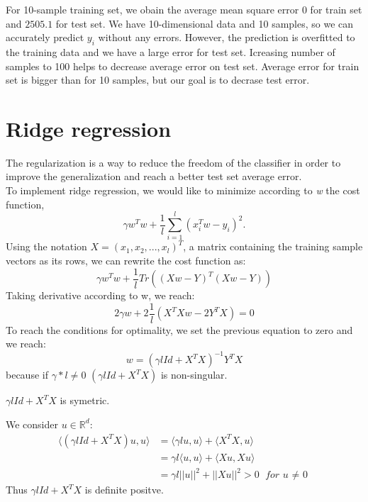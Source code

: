 \documentclass{article} %
\begin{document}
For 10-sample training set, we obain the average mean square error $0$ for train set and $2505.1$ for test set. We have 10-dimensional data and 10 samples, so we can accurately predict $y_i$ without any errors. However, the prediction is overfitted to the training data and we have a large error for test set. Icreasing number of samples to 100 helps to decrease average error on test set. Average error for train set is bigger than for 10 samples, but our goal is to decrase test error.

\section{Ridge regression}

The regularization is a way to reduce the freedom of the classifier in order to improve the generalization and reach a better test set average error. 
\\ To implement ridge regression, we would like to minimize according to \textit{w} the cost function, 
\begin{equation}
\gamma w^{T}w + \frac{1}{l} \sum_{i=1}^{l}(x_{i}^{T}w - y_{i})^{2}.
\end{equation}
Using the notation $X=(x_{1}, x_{2},...,x_{l})^{T}$, a matrix containing the training sample vectors as its rows, we can rewrite the cost function as: 
\begin{equation}
\gamma w^{T} w + \frac{1}{l} Tr((Xw - Y)^{T}(Xw - Y))
\end{equation}
Taking derivative according to w, we reach: 
\begin{equation}
2\gamma w + 2 \frac{1}{l} (X^{T}Xw - 2Y^{T}X)=0
\end{equation}
To reach the conditions for optimality, we set the previous equation to zero and we reach: 
\begin{equation}
w=(\gamma l Id +X^{T}X)^{-1}Y^{T}X
\end{equation}
because if $\gamma*l \ne 0$ $(\gamma l Id +X^{T}X)$ is non-singular.

$\gamma l Id +X^{T}X $ is symetric.

We consider $u \in \mathbb{R}^{d}$:
\begin{align*}
\langle (\gamma l Id +X^{T}X)u,u \rangle &= \langle \gamma l u,u \rangle + \langle X^{T}X,u \rangle
\\  &= \gamma l \langle  u,u \rangle + \langle X u, X u \rangle
\\ &= \gamma l ||u||^{2} + ||Xu||^{2} > 0 \textit{ for u $\ne$ 0}
\end{align*}
Thus $\gamma l Id +X^{T}X$ is definite positve. 
\end{document}
